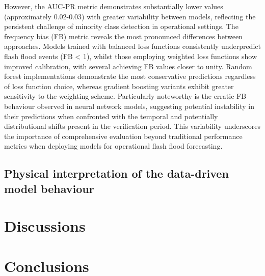 However, the AUC-PR metric demonstrates substantially lower values (approximately 0.02-0.03) with greater variability between models, reflecting the persistent challenge of minority class detection in operational settings.
The frequency bias (FB) metric reveals the most pronounced differences between approaches. Models trained with balanced loss functions consistently underpredict flash flood events (FB < 1), whilst those employing weighted loss functions show improved calibration, with several achieving FB values closer to unity. Random forest implementations demonstrate the most conservative predictions regardless of loss function choice, whereas gradient boosting variants exhibit greater sensitivity to the weighting scheme. Particularly noteworthy is the erratic FB behaviour observed in neural network models, suggesting potential instability in their predictions when confronted with the temporal and potentially distributional shifts present in the verification period. This variability underscores the importance of comprehensive evaluation beyond traditional performance metrics when deploying models for operational flash flood forecasting.





\subsection{Physical interpretation of the data-driven model behaviour}
\label{data_driven_flash_floods_short_medium_range_physical_interpretation}


\section{Discussions}
\label{data_driven_flash_floods_short_medium_range_discussions}


\section{Conclusions}
\label{data_driven_flash_floods_short_medium_range_conclusions}
